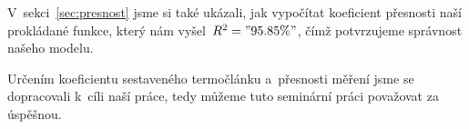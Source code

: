 V~sekci~\ref{sec:presnost} jsme si také ukázali, jak vypočítat koeficient
přesnosti naší prokládané funkce, který nám vyšel~$R^2="95.85 \%"$, čímž
potvrzujeme správnost našeho modelu.

Určením koeficientu sestaveného termočlánku a~přesnosti měření jsme se
dopracovali k~cíli naší práce, tedy můžeme tuto seminární práci považovat za
úspěšnou.
